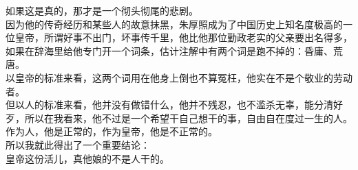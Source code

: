 \begin{multicols}{\theparacolNo}
如果这是真的，那才是一个彻头彻尾的悲剧。\\

因为他的传奇经历和某些人的故意抹黑，朱厚照成为了中国历史上知名度极高的一位皇帝，所谓好事不出门，坏事传千里，他比他那位勤政老实的父亲要出名得多，如果在辞海里给他专门开一个词条，估计注解中有两个词是跑不掉的：昏庸、荒唐。\\

以皇帝的标准来看，这两个词用在他身上倒也不算冤枉，他实在不是个敬业的劳动者。\\

但以人的标准来看，他并没有做错什么，他并不残忍，也不滥杀无辜，能分清好歹，所以在我看来，他不过是一个希望干自己想干的事，自由自在度过一生的人。\\

作为人，他是正常的，作为皇帝，他是不正常的。\\

所以我就此得出了一个重要结论：\\

皇帝这份活儿，真他娘的不是人干的。\\
\ifnum{}
	\end{multicols}
\fi
\newpage
